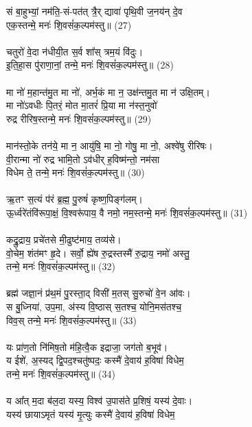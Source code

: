 सं बा॒हुभ्यां॒ नम॑ति॒-सं-पत॑त् त्रै॒र् द्यावा॑ पृथि॒वी ज॒नय॑न् दे॒व\\
 एक॒स्तन्मे॒ मनः॑ शि॒वसं॑क॒ल्पम॑स्तु॥ (27)\\
\\
चतुरो॑ वे॒दा न॑धीयी॒त स॒र्व शा᳚स् त्रम॒यं वि॑दुः।  \\
इ॒ति॒हा॒स पु॑राणा॒नां॒ तन्मे॒ मनः॑ शि॒वसं॑क॒ल्पम॑स्तु॥ (28)\\
\\
मा नो॑ म॒हान्त॑मु॒त मा नो॑, अर्भ॒कं मा न॒ उक्ष॑न्तमु॒त मा न॑ उक्षि॒तम्। \\
मा नो॑ऽवधीः पि॒तरं॒ मोत मा॒तरं॑ प्रि॒या मा न॑स्त॒नुवो॑ \\
रुद्र रीरिष॒स्तन्मे॒ मनः॑ शि॒वसं॑क॒ल्पम॑स्तु॥  (29)\\
\\
मान॑स्तो॒के तन॑ये॒ मा न॒ आयु॑षि॒ मा नो॒ गोषु॒ मा नो॒, अश्वे॑षु रीरिषः। \\
वी॒रान्मा नो॑ रुद्र भामि॒तो ऽव॑धीर् ह॒विष्म॑न्तो॒ नम॑सा \\
विधेम ते॒ तन्मे॒ मनः॑ शि॒वसं॑क॒ल्पम॑स्तु॥ (30)\\
\\
ऋ॒तꣳ स॒त्यं प॑रं ब्र॒ह्म॒ पु॒रुषं॑ कृष्ण॒पिङ्ग॑लम्। \\
ऊ॒र्ध्वरे॑तंवि॑रूपा॒क्षं॒ वि॒श्वरू॑पाय॒ वै नमो॒ नम॒स्तन्मे॒ मनः॑ शि॒वसं॑क॒ल्पम॑स्तु॥ (31)\\
\\
कद्रु॒द्राय॒ प्रचे॑तसे मी॒ढुष्ट॑माय॒ तव्य॑से। \\
वो॒चेम॒ शंत॑मꣳ हृ॒दे। सर्वो॒ ह्ये॑ष रु॒द्रस्तस्मै॑ रु॒द्राय॒ नमो॑ अस्तु॒ \\
तन्मे॒ मनः॑ शि॒वसं॑क॒ल्पम॑स्तु॥ (32)\\
\\
ब्रह्म॑ जज्ञा॒नं प्र॑थ॒मं पु॒रस्ता॒द् विसी॑ म॒तस् सु॒रुचो॑ वे॒न आ॑वः। \\
स बु॒ध्निया॑, उप॒मा, अ॑स्य वि॒ष्ठास् स॒तश्च॒ योनि॒मस॑तश्च॒ \\
विव॒स् तन्मे॒ मनः॑ शि॒वसं॑क॒ल्पम॑स्तु॥ (33)\\
\\
यः प्रा॑ण॒तो नि॑मिष॒तो म॑हि॒त्वै॒क इद्राजा॒ जग॑तो ब॒भूव॑।\\
य ईशे॑, अ॒स्यद् द्वि॒पद॒श्चतु॑ष्पदः॒ कस्मै॑ दे॒वाय॑ ह॒विषा॑ विधेम॒ \\
तन्मे॒ मनः॑ शि॒वसं॑क॒ल्पम॑स्तु॥ (34)\\
\\
य आ᳚त् म॒दा ब॑ल॒दा यस्य॒ विश्व॑ उ॒पास॑ते प्र॒शिषं॒ यस्य॑ दे॒वाः। \\
यस्य॑ छायाऽमृतं यस्य॑ मृ॒त्युः कस्मै॑ दे॒वाय॑ ह॒विषा॑ विधेम॒ \\
